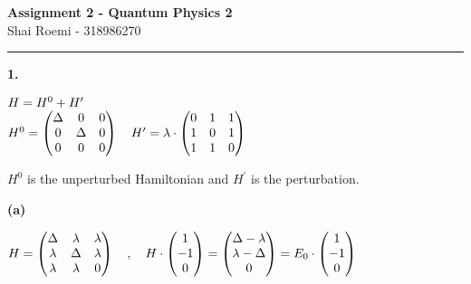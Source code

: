 \documentclass[14pt]{extarticle}
\makeatletter
\newenvironment{lefteqs}{%
    \begin{flushleft}%
    \renewcommand{\arraystretch}{1.3}%
    $\begin{array}{@{}l@{}}%
}{%
    \end{array}$%
    \end{flushleft}%
}
\makeatother
\begin{document}
\begin{center}
    {\LARGE \textbf{Assignment 2 - Quantum Physics 2}}\\[0.5em]
    {\large Shai Roemi - 318986270}\\[0.3em]
\end{center}

\hrule
\vspace{2em}

\textbf{\large 1.}
\begin{lefteqs}
    H = H^0 + H^\prime \\
    H^0 = \begin{pmatrix}
        \Delta & 0 & 0 \\
        0 & \Delta & 0 \\
        0 & 0 & 0
    \end{pmatrix}
    \quad
    H^\prime = \lambda \cdot \begin{pmatrix}
        0 & 1 & 1 \\
        1 & 0 & 1 \\
        1 & 1 & 0 \\
    \end{pmatrix}
\end{lefteqs}
$H^0$ is the unperturbed Hamiltonian and $H^\prime$ is the perturbation.

\textbf{(a)}
\begin{lefteqs}
    H = \begin{pmatrix}
        \Delta & \lambda & \lambda \\
        \lambda & \Delta & \lambda \\
        \lambda & \lambda & 0 \\
    \end{pmatrix}
    \quad
    ,
    \quad
    H \cdot \begin{pmatrix}
        1 \\
        -1 \\
        0 \\
    \end{pmatrix}
    = \begin{pmatrix}
        \Delta - \lambda \\
        \lambda - \Delta \\
        0
    \end{pmatrix}
    = E_0 \cdot \begin{pmatrix}
        1 \\
        -1 \\
        0
    \end{pmatrix}
\end{lefteqs}
\end{document}
